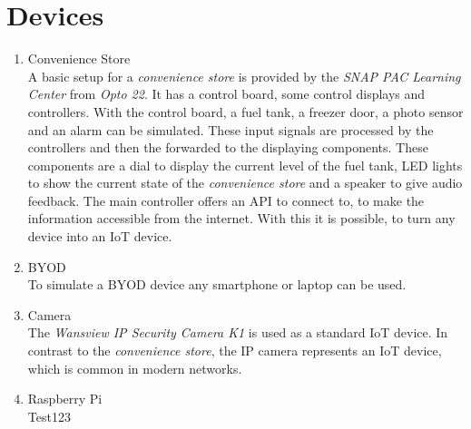 \section{Devices}
\begin{enumerate}
	\item Convenience Store \\
	A basic setup for a \textit{convenience store} is provided by the \textit{SNAP PAC Learning Center} from \textit{Opto 22}. It has a control board, some control displays and controllers. With the control board, a fuel tank, a freezer door, a photo sensor and an alarm can be simulated. These input signals are processed by the controllers and then the forwarded to the displaying components. These components are a dial to display the current level of the fuel tank, LED lights to show the current state of the \textit{convenience store} and a speaker to give audio feedback. The main controller offers an API to connect to, to make the information accessible from the internet. With this it is possible, to turn any device into an IoT device.
	\item BYOD \\
	To simulate a BYOD device any smartphone or laptop can be used. 
	\item Camera \\
	The \textit{Wansview IP Security Camera K1} is used as a standard IoT device. In contrast to the \textit{convenience store}, the IP camera represents an IoT device, which is common in modern networks.  
	\item Raspberry Pi \\
	Test123
\end{enumerate}